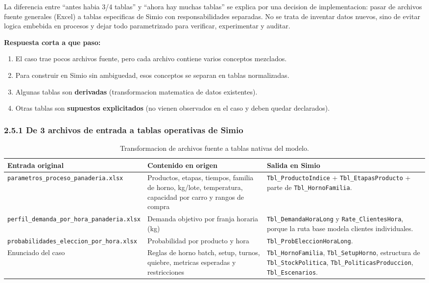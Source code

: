 \documentclass[11pt]{article}
\newcommand{\tabla}[1]{\texttt{#1}}
\newcommand{\dato}[1]{\texttt{#1}}
\begin{document}
La diferencia entre ``antes habia 3/4 tablas'' y ``ahora hay muchas tablas'' se explica por una decision de implementacion: pasar de archivos fuente generales (Excel) a tablas especificas de Simio con responsabilidades separadas. No se trata de inventar datos nuevos, sino de evitar logica embebida en procesos y dejar todo parametrizado para verificar, experimentar y auditar.

\textbf{Respuesta corta a que paso:}
\begin{enumerate}
  \item El caso trae pocos archivos fuente, pero cada archivo contiene varios conceptos mezclados.
  \item Para construir en Simio sin ambiguedad, esos conceptos se separan en tablas normalizadas.
  \item Algunas tablas son \textbf{derivadas} (transformacion matematica de datos existentes).
  \item Otras tablas son \textbf{supuestos explicitados} (no vienen observados en el caso y deben quedar declarados).
\end{enumerate}

\subsubsection{2.5.1 De 3 archivos de entrada a tablas operativas de Simio}

\begin{table}[H]
\centering
\caption{Transformacion de archivos fuente a tablas nativas del modelo.}
\scriptsize
\begin{tabularx}{\textwidth}{L{3.9cm}L{4.2cm}Y}
\toprule
{}
\color{white}Entrada original & \color{white}Contenido en origen & \color{white}Salida en Simio \\
\midrule
\dato{parametros\_proceso\_panaderia.xlsx} &
Productos, etapas, tiempos, familia de horno, kg/lote, temperatura, capacidad por carro y rangos de compra &
\tabla{Tbl\_ProductoIndice} + \tabla{Tbl\_EtapasProducto} + parte de \tabla{Tbl\_HornoFamilia}. \\
\dato{perfil\_demanda\_por\_hora\_panaderia.xlsx} &
Demanda objetivo por franja horaria (kg) &
\tabla{Tbl\_DemandaHoraLong} y \tabla{Rate\_ClientesHora}, porque la ruta base modela clientes individuales. \\
\dato{probabilidades\_eleccion\_por\_hora.xlsx} &
Probabilidad por producto y hora &
\tabla{Tbl\_ProbEleccionHoraLong}. \\
Enunciado del caso &
Reglas de horno batch, setup, turnos, quiebre, metricas esperadas y restricciones &
\tabla{Tbl\_HornoFamilia}, \tabla{Tbl\_SetupHorno}, estructura de \tabla{Tbl\_StockPolitica}, \tabla{Tbl\_PoliticasProduccion}, \tabla{Tbl\_Escenarios}. \\
\bottomrule
\end{tabularx}
\normalsize
\end{table}
\end{document}
